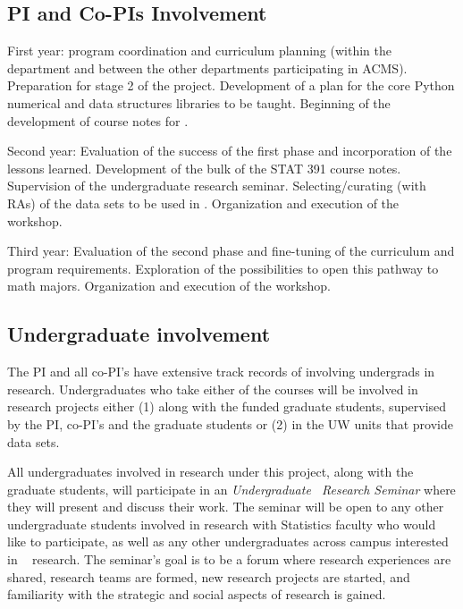 \subsection{PI and Co-PIs Involvement}

\bits
\item First year: program coordination and curriculum planning (within the department and between the other departments participating in ACMS). Preparation for stage 2 of the project. 
Development of a plan for the core Python numerical and data structures libraries to be taught.
Beginning of the development of course notes for \statcl.

\item Second year: Evaluation of the success of the first phase and
  incorporation of the lessons learned. Development of the bulk of the STAT 391 course
  notes. Supervision of  the undergraduate research seminar. 
 Selecting/curating  (with RAs) of the data sets to be used in
  \statcl. Organization and execution of the workshop. 

\item Third year: Evaluation of the second phase and fine-tuning of
  the curriculum and program requirements. Exploration of the possibilities to
  open this pathway to math majors. Organization and execution of the workshop. 
 \eits

\subsection{Undergraduate involvement}

The PI and all co-PI's have extensive track records of involving
undergrads in research. Undergraduates who take either of the courses will be involved in
research projects either (1) along with the funded graduate students,
supervised by the PI, co-PI's and the graduate students or (2) in the
UW units that provide data sets.

All undergraduates involved in research under this project, along with
the graduate students, will participate in an {\em Undergraduate
\cdse\  Research Seminar}  where they will present and
discuss their work.  
The seminar will be open to any other undergraduate students involved
in research with Statistics faculty who would like to participate, as
well as any other undergraduates across campus interested in \cdse~
research. The seminar's goal is to be a forum where research
experiences are shared, research teams are formed, new research
projects are started, and familiarity with the strategic and social
aspects of research is gained. 

